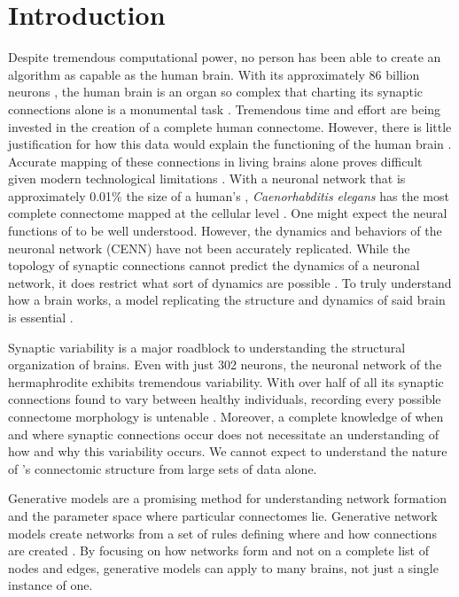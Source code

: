 \section{Introduction}

Despite tremendous computational power, no person has been able to create an algorithm as capable as the human brain. 
With its approximately 86 billion neurons \citep{Azevedo}, the human brain is an organ so complex that charting its synaptic connections alone is a monumental task \citep{VanEssen}. 
Tremendous time and effort are being invested in the creation of a complete human connectome. However, there is little justification for how this data would explain the functioning of the human brain \citep{Ceylan, Rheault}. 
Accurate mapping of these connections in living brains alone proves difficult given modern technological limitations \citep{Rheault}. 
With a neuronal network that is approximately 0.01\% the size of a human’s \citep{Azevedo}, \textit{Caenorhabditis elegans} has the most complete connectome mapped at the cellular level \citep{White}. 
One might expect the neural functions of \ce to be well understood. 
However, the dynamics and behaviors of the \ce neuronal network (CENN) have not been accurately replicated. 
While the topology of synaptic connections cannot predict the dynamics of a neuronal network, it does restrict what sort of dynamics are possible \citep{Prinz}.
To truly understand how a brain works, a model replicating the structure and dynamics of said brain is essential \citep{Izquierdo}.

Synaptic variability is a major roadblock to understanding the structural organization of brains. 
Even with just 302 neurons, the neuronal network of the hermaphrodite \ce exhibits tremendous variability. 
With over half of all its synaptic connections found to vary between healthy individuals, recording every possible \ce connectome morphology is untenable \citep{Witvliet}.
Moreover, a complete knowledge of when and where synaptic connections  occur does not necessitate an understanding of how and why this variability occurs. 
We cannot expect to understand the nature of \ce's connectomic structure from large sets of data alone.

Generative models are a promising method for understanding network formation and the parameter space where particular connectomes lie. 
Generative network models create networks from a set of rules defining where and how connections are created \citep{Betzel}. 
By focusing on how networks form and not on a complete list of nodes and edges, generative models can apply to many brains, not just a single instance of one.
 
